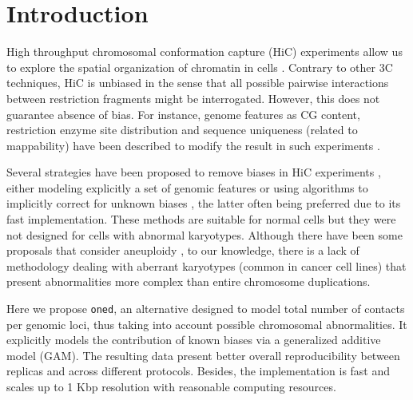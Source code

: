 \documentclass{bioinfo}
\begin{document}
\section{Introduction}

High throughput chromosomal conformation capture (HiC) experiments allow us to explore the spatial organization of chromatin in cells \citep{lieberman2009comprehensive}. Contrary to other 3C techniques, HiC is unbiased in the sense that all possible pairwise interactions between restriction fragments might be interrogated. However, this does not guarantee absence of bias. For instance, genome features as CG content, restriction enzyme site distribution and sequence uniqueness (related to mappability) have been described to modify the result in such experiments \citep{yaffe2011probabilistic}.

Several strategies have been proposed to remove biases in HiC experiments \citep{schmitt2016genome}, either modeling explicitly a set of genomic features \citep{yaffe2011probabilistic,hu2012hicnorm} or using algorithms to implicitly correct for unknown biases \citep{imakaev2012iterative}, the latter often being preferred due to its fast implementation. These methods are suitable for normal cells but they were not designed for cells with abnormal karyotypes. Although there have been some proposals that consider aneuploidy \citep{wu2016computational}, to our knowledge, there is a lack of methodology dealing with aberrant karyotypes (common in cancer cell lines) that present abnormalities more complex than entire chromosome duplications.

Here we propose \texttt{oned}, an alternative designed to model total number of contacts per genomic loci, thus taking into account possible chromosomal abnormalities. It explicitly models the contribution of known biases via a generalized additive model (GAM). The resulting data present better overall reproducibility between replicas and across different protocols. Besides, the implementation is fast and scales up to 1 Kbp resolution with reasonable computing resources.

\end{document}
